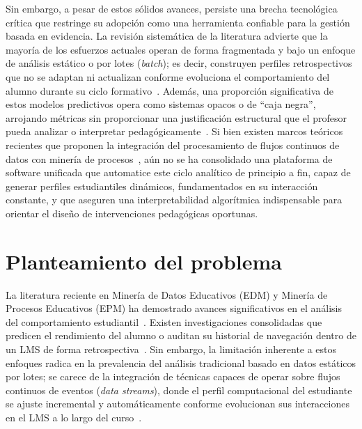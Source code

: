 Sin embargo, a pesar de estos sólidos avances, persiste una brecha tecnológica crítica que restringe su adopción como una herramienta confiable para la gestión basada en evidencia. La revisión sistemática de la literatura advierte que la mayoría de los esfuerzos actuales operan de forma fragmentada y bajo un enfoque de análisis estático o por lotes (\textit{batch}); es decir, construyen perfiles retrospectivos que no se adaptan ni actualizan conforme evoluciona el comportamiento del alumno durante su ciclo formativo~\cite{Semler2025,YeseniaZavaleta-Sanchez2025}. Además, una proporción significativa de estos modelos predictivos opera como sistemas opacos o de ``caja negra'', arrojando métricas sin proporcionar una justificación estructural que el profesor pueda analizar o interpretar pedagógicamente~\cite{BarredoArrieta2020,Lee2025}. Si bien existen marcos teóricos recientes que proponen la integración del procesamiento de flujos continuos de datos con minería de procesos~\cite{YeseniaZavaleta-Sanchez2025}, aún no se ha consolidado una plataforma de software unificada que automatice este ciclo analítico de principio a fin, capaz de generar perfiles estudiantiles dinámicos, fundamentados en su interacción constante, y que aseguren una interpretabilidad algorítmica indispensable para orientar el diseño de intervenciones pedagógicas oportunas.

\section{Planteamiento del problema}
La literatura reciente en Minería de Datos Educativos (EDM) y Minería de Procesos Educativos (EPM) ha demostrado avances significativos en el análisis del comportamiento estudiantil~\cite{Semler2025,Supriyanto2025}. Existen investigaciones consolidadas que predicen el rendimiento del alumno o auditan su historial de navegación dentro de un LMS de forma retrospectiva~\cite{Mercado2024,Setiadi2025}. Sin embargo, la limitación inherente a estos enfoques radica en la prevalencia del análisis tradicional basado en datos estáticos por lotes; se carece de la integración de técnicas capaces de operar sobre flujos continuos de eventos (\textit{data streams}), donde el perfil computacional del estudiante se ajuste incremental y automáticamente conforme evolucionan sus interacciones en el LMS a lo largo del curso~\cite{Batool2021,YeseniaZavaleta-Sanchez2025}.

